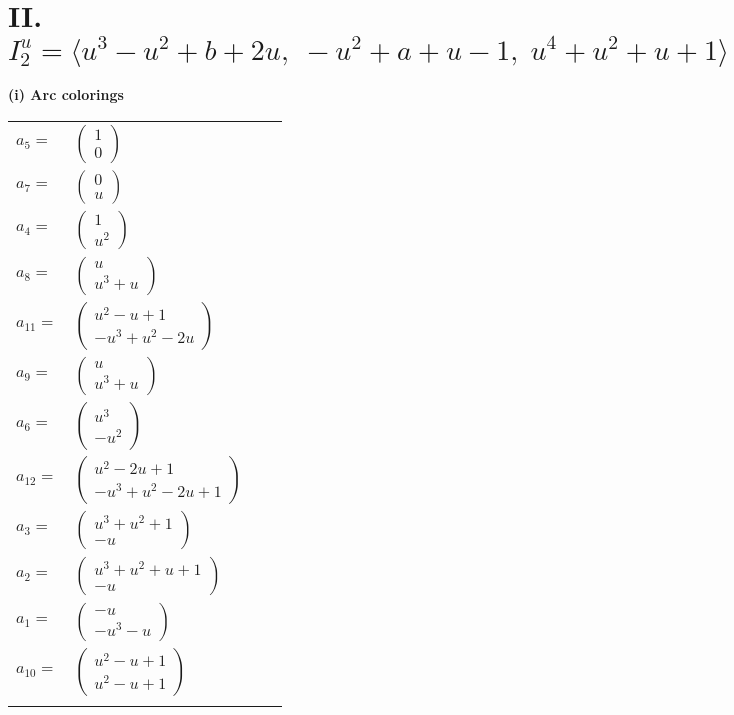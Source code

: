 \documentclass[1p]{elsarticle_modified}
\theoremstyle{definition}
\begin{document}
\centering \section*{II. $I^u_{2}= \langle u^3- u^2+b+2 u,\;- u^2+a+u-1,\;u^4+u^2+u+1 \rangle$}
\flushleft \textbf{(i) Arc colorings}\\
\begin{tabular}{m{7pt} m{180pt} m{7pt} m{180pt} }
\flushright $a_{5}=$&$\begin{pmatrix}1\\0\end{pmatrix}$ \\
\flushright $a_{7}=$&$\begin{pmatrix}0\\u\end{pmatrix}$ \\
\flushright $a_{4}=$&$\begin{pmatrix}1\\u^2\end{pmatrix}$ \\
\flushright $a_{8}=$&$\begin{pmatrix}u\\u^3+u\end{pmatrix}$ \\
\flushright $a_{11}=$&$\begin{pmatrix}u^2- u+1\\- u^3+u^2-2 u\end{pmatrix}$ \\
\flushright $a_{9}=$&$\begin{pmatrix}u\\u^3+u\end{pmatrix}$ \\
\flushright $a_{6}=$&$\begin{pmatrix}u^3\\- u^2\end{pmatrix}$ \\
\flushright $a_{12}=$&$\begin{pmatrix}u^2-2 u+1\\- u^3+u^2-2 u+1\end{pmatrix}$ \\
\flushright $a_{3}=$&$\begin{pmatrix}u^3+u^2+1\\- u\end{pmatrix}$ \\
\flushright $a_{2}=$&$\begin{pmatrix}u^3+u^2+u+1\\- u\end{pmatrix}$ \\
\flushright $a_{1}=$&$\begin{pmatrix}- u\\- u^3- u\end{pmatrix}$ \\
\flushright $a_{10}=$&$\begin{pmatrix}u^2- u+1\\u^2- u+1\end{pmatrix}$\\&\end{tabular}
\end{document}
